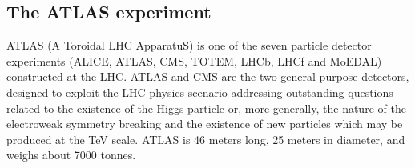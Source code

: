 










\subsection{The ATLAS experiment}
\label{sect:atlas}
ATLAS (A Toroidal LHC ApparatuS)\cite{atlas} is one of the seven particle detector experiments (ALICE, ATLAS, CMS, TOTEM, LHCb, LHCf and MoEDAL) constructed at the LHC.
ATLAS and CMS are the two general-purpose detectors, designed to exploit the LHC physics scenario addressing outstanding questions related to the existence of the Higgs particle or, more generally, the nature of the electroweak symmetry breaking and the existence of new particles which may be produced at the TeV scale.
ATLAS is 46 meters long, 25 meters in diameter, and weighs about 7000 tonnes.%


